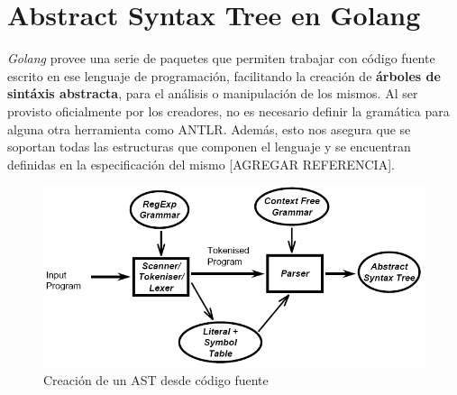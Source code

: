 \section{Abstract Syntax Tree en Golang}
\textit{Golang} provee una serie de paquetes que permiten trabajar con código fuente escrito en ese lenguaje de programación, facilitando la creación de \textbf{árboles de sintáxis abstracta}, para el análisis o manipulación de los mismos.
Al ser provisto oficialmente por los creadores, no es necesario definir la gramática para alguna otra herramienta como ANTLR.
Además, esto nos asegura que se soportan todas las estructuras que componen el lenguaje y se encuentran definidas en la especificación del mismo [AGREGAR REFERENCIA].

\begin{figure}[H]
  \includegraphics[width=12cm]{implementation/parsingpipeline}
  \centering
  \caption{Creación de un AST desde código fuente}
\end{figure}

